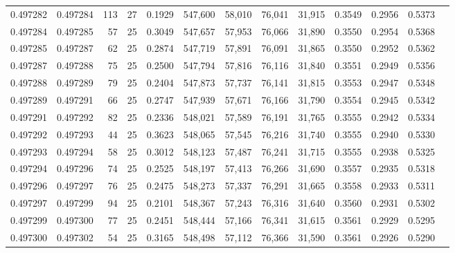 \begin{tabular}{rrrrrrrrrrrrr}
0.497282 & 0.497284 &   113 &  27 &                                     0.1929 & 547,600 &  58,010 &  76,041 &  31,915 & 0.3549 & 0.2956 & 0.5373 \\
0.497284 & 0.497285 &    57 &  25 &                                     0.3049 & 547,657 &  57,953 &  76,066 &  31,890 & 0.3550 & 0.2954 & 0.5368 \\
0.497285 & 0.497287 &    62 &  25 &                                     0.2874 & 547,719 &  57,891 &  76,091 &  31,865 & 0.3550 & 0.2952 & 0.5362 \\
0.497287 & 0.497288 &    75 &  25 &                                     0.2500 & 547,794 &  57,816 &  76,116 &  31,840 & 0.3551 & 0.2949 & 0.5356 \\
0.497288 & 0.497289 &    79 &  25 &                                     0.2404 & 547,873 &  57,737 &  76,141 &  31,815 & 0.3553 & 0.2947 & 0.5348 \\
0.497289 & 0.497291 &    66 &  25 &                                     0.2747 & 547,939 &  57,671 &  76,166 &  31,790 & 0.3554 & 0.2945 & 0.5342 \\
0.497291 & 0.497292 &    82 &  25 &                                     0.2336 & 548,021 &  57,589 &  76,191 &  31,765 & 0.3555 & 0.2942 & 0.5334 \\
0.497292 & 0.497293 &    44 &  25 &                                     0.3623 & 548,065 &  57,545 &  76,216 &  31,740 & 0.3555 & 0.2940 & 0.5330 \\
0.497293 & 0.497294 &    58 &  25 &                                     0.3012 & 548,123 &  57,487 &  76,241 &  31,715 & 0.3555 & 0.2938 & 0.5325 \\
0.497294 & 0.497296 &    74 &  25 &                                     0.2525 & 548,197 &  57,413 &  76,266 &  31,690 & 0.3557 & 0.2935 & 0.5318 \\
0.497296 & 0.497297 &    76 &  25 &                                     0.2475 & 548,273 &  57,337 &  76,291 &  31,665 & 0.3558 & 0.2933 & 0.5311 \\
0.497297 & 0.497299 &    94 &  25 &                                     0.2101 & 548,367 &  57,243 &  76,316 &  31,640 & 0.3560 & 0.2931 & 0.5302 \\
0.497299 & 0.497300 &    77 &  25 &                                     0.2451 & 548,444 &  57,166 &  76,341 &  31,615 & 0.3561 & 0.2929 & 0.5295 \\
0.497300 & 0.497302 &    54 &  25 &                                     0.3165 & 548,498 &  57,112 &  76,366 &  31,590 & 0.3561 & 0.2926 & 0.5290 \\

\end{tabular}
